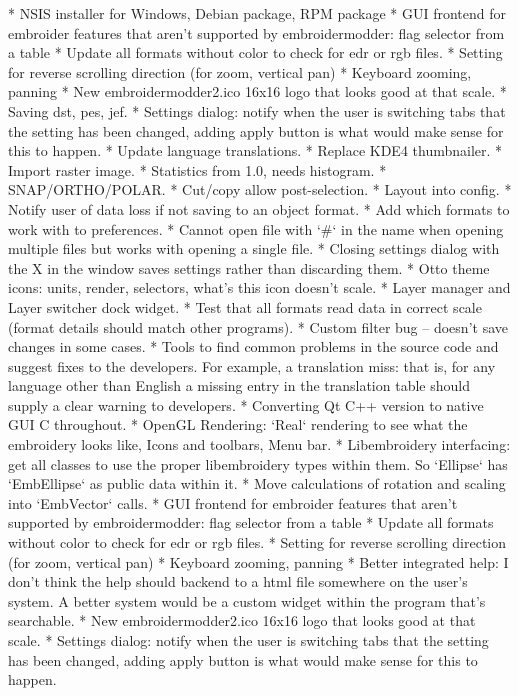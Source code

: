 \documentclass[11pt]{report}
\begin{document}
    * NSIS installer for Windows, Debian package, RPM package
    * GUI frontend for embroider features that aren't supported by embroidermodder: flag selector from a table
    * Update all formats without color to check for edr or rgb files.
    * Setting for reverse scrolling direction (for zoom, vertical pan)
    * Keyboard zooming, panning
    * New embroidermodder2.ico 16x16 logo that looks good at that scale.
    * Saving dst, pes, jef.
    * Settings dialog: notify when the user is switching tabs that the setting has been changed, adding apply button is what would make sense for this to happen.
    * Update language translations.
    * Replace KDE4 thumbnailer.
    * Import raster image.
    * Statistics from 1.0, needs histogram.
    * SNAP/ORTHO/POLAR.
    * Cut/copy allow post-selection.
    * Layout into config.
    * Notify user of data loss if not saving to an object format.
    * Add which formats to work with to preferences.
    * Cannot open file with `\#` in the name when opening multiple files but works with opening a single file.
    * Closing settings dialog with the X in the window saves settings rather than discarding them.
    * Otto theme icons: units, render, selectors, what's this icon doesn't scale.
    * Layer manager and Layer switcher dock widget.
    * Test that all formats read data in correct scale (format details should match other programs).
    * Custom filter bug -- doesn't save changes in some cases.
    * Tools to find common problems in the source code and suggest fixes to the developers. For example, a translation miss: that is, for any language other than English a missing entry in the translation table should supply a clear warning to developers.
    * Converting Qt C++ version to native GUI C throughout.
    * OpenGL Rendering: `Real` rendering to see what the embroidery looks like, Icons and toolbars, Menu bar.
    * Libembroidery interfacing: get all classes to use the proper libembroidery types within them. So `Ellipse` has `EmbEllipse` as public data within it.
    * Move calculations of rotation and scaling into `EmbVector` calls.
    * GUI frontend for embroider features that aren't supported by embroidermodder: flag selector from a table
    * Update all formats without color to check for edr or rgb files.
    * Setting for reverse scrolling direction (for zoom, vertical pan)
    * Keyboard zooming, panning
    * Better integrated help: I don't think the help should backend to a html file somewhere on the user's system. A better system would be a custom widget within the program that's searchable.
    * New embroidermodder2.ico 16x16 logo that looks good at that scale.
    * Settings dialog: notify when the user is switching tabs that the setting has been changed, adding apply button is what would make sense for this to happen.
    
\end{document}
